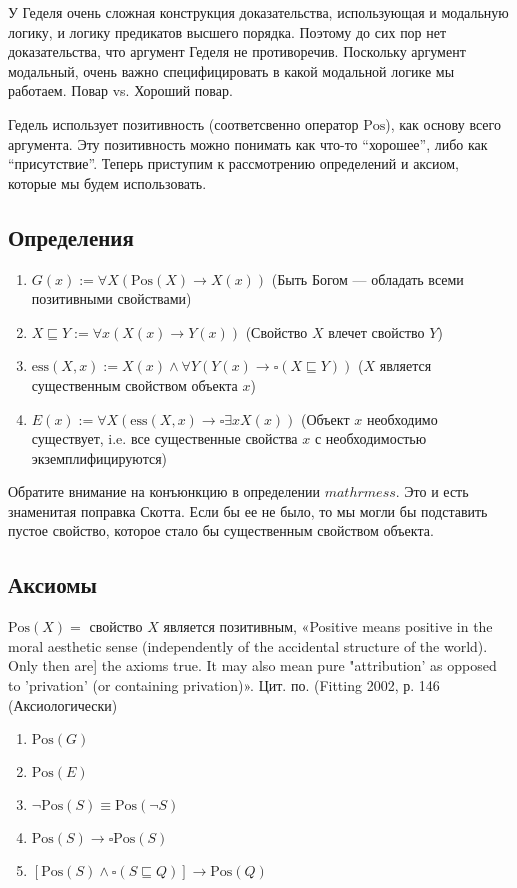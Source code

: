 \documentclass[openany]{book}
\theoremstyle{plain}
\theoremstyle{definition}
\begin{document}
У Геделя очень сложная конструкция доказательства, использующая и модальную логику, и логику предикатов высшего порядка. Поэтому до сих пор нет доказательства, что аргумент Геделя не противоречив. Поскольку аргумент модальный, очень важно специфицировать в какой модальной логике мы работаем. Повар vs. Хороший повар.

Гедель использует позитивность (соответсвенно оператор \(\mathrm{Pos}\)), как основу всего аргумента. Эту позитивность можно понимать как что-то ``хорошее'', либо как ``присутствие''. Теперь приступим к рассмотрению определений и аксиом, которые мы будем использовать. 

\subsection{Определения}
\begin{enumerate}
\item \(G(x) := \forall X (\mathrm{Pos}(X) \rightarrow X(x))\) (Быть Богом --- обладать всеми позитивными свойствами)
\item \(X \sqsubseteq Y := \forall x (X(x) \rightarrow Y(x))\) (Свойство \(X\) влечет свойство \(Y\))
\item \(\mathrm{ess}(X, x) := X(x) \land \forall Y (Y(x) \rightarrow \square (X \sqsubseteq Y))\) (\(X\) является существенным свойством объекта \(x\))
\item \(E(x) := \forall X (\mathrm{ess}(X, x) \rightarrow \square \exists x X(x))\) (Объект \(x\) необходимо существует, i.e. все существенные свойства \(x\) с необходимостью экземплифицируются)
\end{enumerate}

Обратите внимание на конъюнкцию в определении \(mathrm{ess}\). Это и есть знаменитая поправка Скотта. Если бы ее не было, то мы могли бы подставить пустое свойство, которое стало бы существенным  свойством объекта.

\subsection{Аксиомы}

\(\mathrm{Pos}(X) =\) свойство \(X\) является позитивным,
«Positive means positive in the moral aesthetic sense (independently of the accidental structure of the world). Only then are] the axioms true. It may also mean pure "attribution' as opposed to 'privation' (or containing privation)». Цит. по. (Fitting 2002, р. 146 (Аксиологически)

\begin{enumerate}
\item \(\mathrm{Pos}(G)\)

\item \(\mathrm{Pos}(E)\)

\item \(\neg \mathrm{Pos}(S) \equiv \mathrm{Pos}(\neg S)\)
\item \(\mathrm{Pos}(S) \to \square \mathrm{Pos}(S)\)
\item \([\mathrm{Pos}(S) \land \square (S \sqsubseteq Q)] \to \mathrm{Pos}(Q)\)
\end{enumerate}
\end{document}

